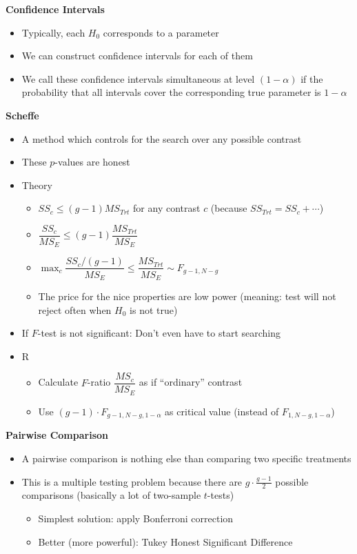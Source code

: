 \documentclass[a4paper]{article}
\begin{document}
\textbf{Confidence Intervals}
\begin{itemize}
    \item Typically, each $H_0$ corresponds to a parameter
    \item We can construct confidence intervals for each of them
    \item We call these confidence intervals simultaneous at level $(1-\alpha)$ if the probability that all intervals cover the corresponding true parameter is $1-\alpha$
\end{itemize}

\textbf{Scheffe}
\begin{itemize}
    \item A method which controls for the search over any possible contrast
    \item These $p$-values are honest
    \item Theory
    \begin{itemize}
        \item $SS_c\leq (g-1)MS_{Trt}$ for any contrast $c$ (because $SS_{Trt}=SS_c+\cdots$)
        \item $\dfrac{SS_c}{MS_E}\leq(g-1)\dfrac{MS_{Trt}}{MS_E}$
        \item $\max_{c}\dfrac{SS_c/(g-1)}{MS_E}\leq\dfrac{MS_{Trt}}{MS_E}\sim F_{g-1,N-g}$
        \item The price for the nice properties are low power (meaning: test will not reject often when $H_0$ is not true)
    \end{itemize}
    \item If $F$-test is not significant: Don't even have to start searching
    \item R
    \begin{itemize}
        \item Calculate $F$-ratio $\dfrac{MS_c}{MS_E}$ as if ``ordinary'' contrast
        \item Use $(g-1)\cdot F_{g-1,N-g,1-\alpha}$ as critical value (instead of $F_{1,N-g,1-\alpha}$)
    \end{itemize}
\end{itemize}

\textbf{Pairwise Comparison}
\begin{itemize}
    \item A pairwise comparison is nothing else than comparing two specific treatments
    \item This is a multiple testing problem because there are $g\cdot\frac{g-1}{2}$ possible comparisons (basically a lot of two-sample $t$-tests)
    \begin{itemize}
        \item Simplest solution: apply Bonferroni correction
        \item Better (more powerful): Tukey Honest Significant Difference
    \end{itemize}
\end{itemize}
\end{document}
